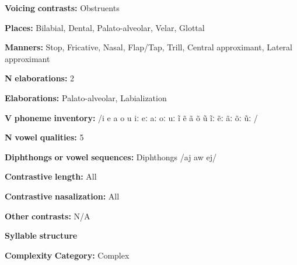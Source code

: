 \documentclass[output=paper]{langsci/langscibook}
\begin{document}
\begin{styleBody}
\textbf{Voicing} \textbf{contrasts:} Obstruents
\end{styleBody}

\begin{styleBody}
\textbf{Places:} Bilabial, Dental, Palato-alveolar, Velar, Glottal
\end{styleBody}

\begin{styleBody}
\textbf{Manners:} Stop, Fricative, Nasal, Flap/Tap, Trill, Central approximant, Lateral approximant
\end{styleBody}

\begin{styleBody}
\textbf{N} \textbf{elaborations:} 2
\end{styleBody}

\begin{styleBody}
\textbf{Elaborations:} Palato-alveolar, Labialization
\end{styleBody}

\begin{styleBody}
\textbf{V} \textbf{phoneme} \textbf{inventory:} /i e a o u iː eː aː oː uː ĩ ẽ ã õ ũ ĩː ẽː ãː õː ũː /
\end{styleBody}

\begin{styleBody}
\textbf{N} \textbf{vowel} \textbf{qualities:} 5
\end{styleBody}

\begin{styleBody}
\textbf{Diphthongs} \textbf{or} \textbf{vowel} \textbf{sequences:} Diphthongs /aj aw ej/
\end{styleBody}

\begin{styleBody}
\textbf{Contrastive} \textbf{length:} All
\end{styleBody}

\begin{styleBody}
\textbf{Contrastive} \textbf{nasalization:} All
\end{styleBody}

\begin{styleBody}
\textbf{Other} \textbf{contrasts:} N/A
\end{styleBody}

\begin{styleBody}
\textbf{Syllable} \textbf{structure}
\end{styleBody}

\begin{styleBody}
\textbf{Complexity} \textbf{Category:} Complex
\end{styleBody}
\end{document}
